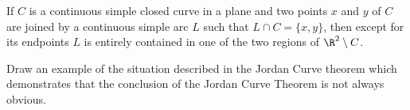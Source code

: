 \begin{response}
\begin{enumerate}
  \end{enumerate}
\end{response}

\begin{theorem} If $C$ is a continuous simple closed curve in a plane and two points $x$ and $y$ of $C$ are joined by a continuous simple arc $L$ such that $L \cap C = \{x, y\}$, then except for its endpoints $L$ is entirely contained in one of the two regions of $\R^2 \setminus C$.
\end{theorem}

\begin{exercise} Draw an example of the situation described in the Jordan Curve theorem which demonstrates that the conclusion of the Jordan Curve Theorem is not always obvious.
\end{exercise}

